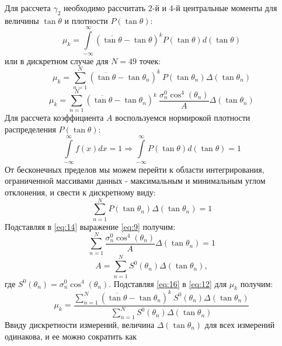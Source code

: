 Для рассчета $\gamma_2$ необходимо рассчитать 2-й и 4-й центральные моменты для величины $\tan \theta$ и плотности $P(\tan \theta)$:
\begin{equation}
  \mu_k = \int \limits_{-\infty}^{\infty}(\overline{\tan \theta}-\tan \theta)^k P(\tan \theta) d(\tan \theta)
  \label{eq:10}
\end{equation} 
или в дискретном случае для $N = 49$ точек:
\begin{equation}
  \mu_k = \sum \limits_{n = 1}^{N} (\overline{\tan\theta} - \tan \theta_n)^k ~P(\tan \theta_n) \Delta(\tan \theta_n)
  \label{eq:11}
\end{equation} 
\begin{equation}
  \mu_k = \sum \limits_{n = 1}^{N} (\overline{\tan\theta} - \tan \theta_n)^k~ \frac{\sigma^0_n \cos^4(\theta_n)}{A} \Delta(\tan \theta_n)
  \label{eq:12}
\end{equation}
Для рассчета коэффициента $A$ воспользуемся нормирокой плотности распределения $P(\tan \theta)$:
\begin{equation}
  \int \limits_{-\infty}^{\infty} f(x)dx = 1 \Rightarrow \int \limits_{-\infty}^{\infty} P(\tan \theta) d(\tan \theta) = 1
  \label{eq:13}
\end{equation}
От бесконечных пределов мы можем перейти к области интегрирования, ограниченной массивами данных - максимальным и
минимальным углом отклонения, и свести к дискретному виду:
\begin{equation}
  \sum \limits_{n = 1}^{N} P(\tan \theta_n) \Delta(\tan \theta_n) = 1
  \label{eq:14}
\end{equation}
Подставляя в \eqref{eq:14} выражение \eqref{eq:9} получим:
\begin{equation}
  \sum \limits_{n = 1}^{N} \frac{\sigma^0_n \cos^4(\theta_n)}{A} \Delta(\tan \theta_n) = 1
  \label{eq:15}
\end{equation}
\begin{equation}
  A = \sum \limits_{n = 1}^{N} S^0(\theta_n) \Delta(\tan \theta_n),
  \label{eq:16}
\end{equation}
где $S^0(\theta_n) = \sigma^0_n \cos^4(\theta_n)$. Подставляя \eqref{eq:16} в \eqref{eq:12} для $\mu_k$ получим:
\begin{equation}
  \mu_k = \frac{\sum \limits_{n = 1}^{N} (\overline{\tan\theta} - \tan \theta_n)^k~ S^0(\theta_n) \Delta(\tan \theta_n)}{\sum \limits_{n = 1}^{N} S^0(\theta_n) \Delta(\tan \theta_n)}
  \label{eq:17}
\end{equation}
Ввиду дискретности измерений, величина $\Delta(\tan \theta_n)$ для всех измерений одинакова, и ее можно сократить как
